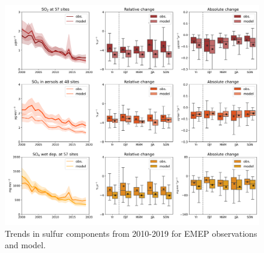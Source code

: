 \begin{figure}
	\centering
	\includegraphics[width=0.74\paperwidth]{FIGS_TRENDS/sulfur_trends.png}
	\caption{\label{fig:SOx_trends}Trends in sulfur components from 2010-2019 for EMEP observations and model.}
\end{figure}

